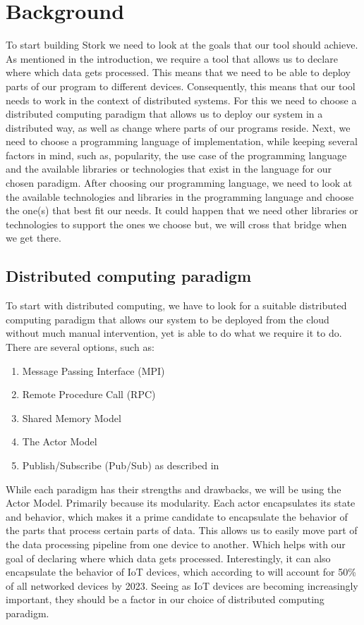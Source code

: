 \documentclass[a4paper]{article}
\begin{document}
\section{Background}
To start building Stork we need to look at the goals that our tool should achieve. As mentioned in the introduction, we require a tool that allows us to declare where which data gets processed. This means that we need to be able to deploy parts of our program to different devices. Consequently, this means that our tool needs to work in the context of distributed systems. For this we need to choose a distributed computing paradigm that allows us to deploy our system in a distributed way, as well as change where parts of our programs reside.
Next, we need to choose a programming language of implementation, while keeping several factors in mind, such as, popularity, the use case of the programming language and the available libraries or technologies that exist in the language for our chosen paradigm.
After choosing our programming language, we need to look at the available technologies and libraries in the programming language and choose the one(s) that best fit our needs. It could happen that we need other libraries or technologies to support the ones we choose but, we will cross that bridge when we get there.
\subsection{Distributed computing paradigm}
To start with distributed computing, we have to look for a suitable distributed computing paradigm that allows our system to be deployed from the cloud without much manual intervention, yet is able to do what we require it to do. There are several options, such as:
\begin{enumerate}
    \item Message Passing Interface (MPI)\cite{MPI}
    \item Remote Procedure Call (RPC)\cite{RPC}
    \item Shared Memory Model\cite{SMM}
    \item The Actor Model\cite{ActorModel}
    \item Publish/Subscribe (Pub/Sub) as described in \cite{PubSub}
\end{enumerate}
While each paradigm has their strengths and drawbacks, we will be using the Actor Model. Primarily because its modularity. Each actor encapsulates its state and behavior, which makes it a prime candidate to encapsulate the behavior of the parts that process certain parts of data. This allows us to easily move part of the data processing pipeline from one device to another. Which helps with our goal of declaring where which data gets processed. Interestingly, it can also encapsulate the behavior of IoT devices, which according to \cite{differentnetworkneedsiot} will account for 50\% of all networked devices by 2023. Seeing as IoT devices are becoming increasingly important, they should be a factor in our choice of distributed computing paradigm.
\end{document}
